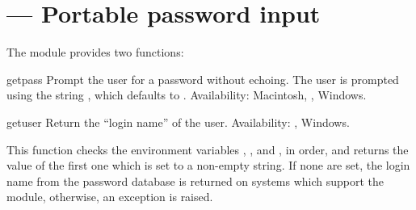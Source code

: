 \section{
         --- Portable password input}



The  module provides two functions:


\begin{funcdesc}{getpass}{}
  Prompt the user for a password without echoing.  The user is
  prompted using the string , which defaults to
  .
  Availability: Macintosh, \UNIX, Windows.
\end{funcdesc}


\begin{funcdesc}{getuser}{}
  Return the ``login name'' of the user.
  Availability: \UNIX, Windows.

  This function checks the environment variables ,
  ,  and , in order, and
  returns the value of the first one which is set to a non-empty
  string.  If none are set, the login name from the password database
  is returned on systems which support the  module,
  otherwise, an exception is raised.
\end{funcdesc}
